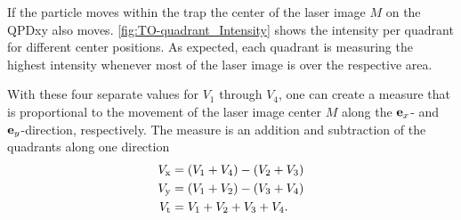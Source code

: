 If the particle moves within the trap the center of the laser image $M$ on the 
QPDxy also moves. \cref{fig:TO-quadrant_Intensity} shows the intensity per 
quadrant for different center positions. As expected, each quadrant is 
measuring the highest intensity whenever most of the laser image is over the 
respective area.

With these four separate values for $V_{1}$ through $V_{4}$, one can create a 
measure that is proportional to the movement of the laser image center $M$ 
along the $\vb{e}_{x}$- and $\vb{e}_{y}$-direction, respectively. The measure is an addition 
and subtraction of the quadrants along one direction
\begin{subequations}
\begin{align}
  V_{\mathrm{x}} & = \left( V_{\mathrm{1}}+V_{\mathrm{4}} \right) - \left( V_{\mathrm{2}} + 
  V_{\mathrm{3}}  \right)
  \label{eq:TO-Vx} \\
  V_{\mathrm{y}} & = \left( V_{\mathrm{1}}+V_{\mathrm{2}} \right) - \left( V_{\mathrm{3}} + 
  V_{\mathrm{4}}  \right)
  \label{eq:TO-Vy} \\
  V_{\mathrm{t}} & = V_{\mathrm{1}}+V_{\mathrm{2}} + V_{\mathrm{3}} + V_{\mathrm{4}}.
  \label{eq:TO-Vt}
\end{align}
\end{subequations}

